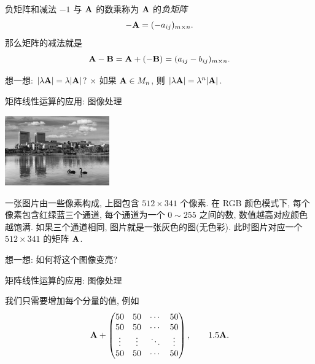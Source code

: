 \begin{frame}{负矩阵和减法}
	\onslide<+->
	$-1$ 与 ${\mathbf{A}}$ 的数乘称为 ${\mathbf{A}}$ 的\emph{负矩阵}
	\[-{\mathbf{A}}=(-a_{ij})_{m\times n}.\]
	\onslide<+->
	那么矩阵的减法就是
	\[{\mathbf{A}}-{\mathbf{B}}={\mathbf{A}}+(-{\mathbf{B}})=(a_{ij}-b_{ij})_{m\times n}.\]
	
	\onslide<+->
	想一想: $|\lambda {\mathbf{A}}|=\lambda |{\mathbf{A}}|$?
	\onslide<+->
	\alert{\Large$\times$}
	如果 ${\mathbf{A}}\in M_n$, 则
	$|\lambda {\mathbf{A}}|=\lambda^n |{\mathbf{A}}|$.
\end{frame}


\begin{frame}{矩阵线性运算的应用: 图像处理}
	\onslide<+->
	\begin{center}
		\includegraphics[height=3cm]{../image/matrix2.jpg}
	\end{center}

	一张图片由一些像素构成, 上图包含 $512\times341$ 个像素.
	\onslide<+->
	在 RGB 颜色模式下, 每个像素包含红绿蓝三个通道, 每个通道为一个 $0\sim255$ 之间的数, 数值越高对应颜色越饱满.
	\onslide<+->
	如果三个通道相同, 图片就是一张灰色的图(无色彩).
	此时图片对应一个 $512\times 341$ 的矩阵 ${\mathbf{A}}$.

	\onslide<+->
	想一想: 如何将这个图像变亮?
\end{frame}


\begin{frame}{矩阵线性运算的应用: 图像处理}
	\onslide<+->
	\begin{center}
	\end{center}
	
	\onslide<+->
	我们只需要增加每个分量的值, 例如
	\[{\mathbf{A}}+\begin{pmatrix}
		50&50&\cdots&50\\
		50&50&\cdots&50\\
		\vdots&\vdots&\ddots&\vdots\\
		50&50&\cdots&50
	\end{pmatrix},\qquad
	1.5{\mathbf{A}}.\]
\end{frame}


